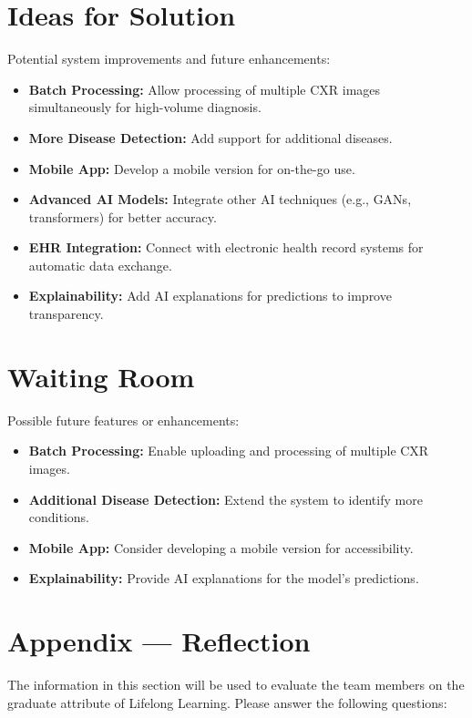 \documentclass[12pt]{article}
\begin{document}
\section{Ideas for Solution}
Potential system improvements and future enhancements:
\begin{itemize}
    \item \textbf{Batch Processing:} Allow processing of multiple CXR images simultaneously for 
    high-volume diagnosis.
    \item \textbf{More Disease Detection:} Add support for additional diseases.
    \item \textbf{Mobile App:} Develop a mobile version for on-the-go use.
    \item \textbf{Advanced AI Models:} Integrate other AI techniques (e.g., GANs, transformers) 
    for better accuracy.
    \item \textbf{EHR Integration:} Connect with electronic health record systems for automatic 
    data exchange.
    \item \textbf{Explainability:} Add AI explanations for predictions to improve transparency.
\end{itemize}

\section{Waiting Room}
Possible future features or enhancements:
\begin{itemize}
    \item \textbf{Batch Processing:} Enable uploading and processing of multiple CXR images.
    \item \textbf{Additional Disease Detection:} Extend the system to identify more conditions.
    \item \textbf{Mobile App:} Consider developing a mobile version for accessibility.
    \item \textbf{Explainability:} Provide AI explanations for the model's predictions.
\end{itemize}



\newpage{}
\section*{Appendix --- Reflection}

The information in this section will be used to evaluate the team members on the
graduate attribute of Lifelong Learning.  Please answer the following questions:
\end{document}
